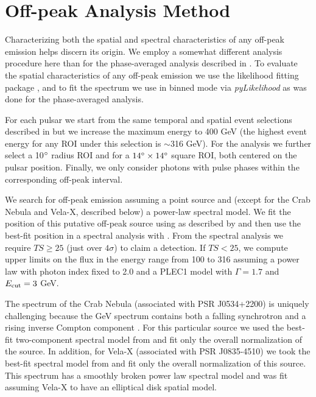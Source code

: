 \section{Off-peak Analysis Method}

Characterizing both the spatial and spectral characteristics of any
off-peak emission helps discern its origin.  We employ a somewhat
different analysis procedure here than for the phase-averaged analysis
described in \citep{abdo_2013a_second-fermi}.  To evaluate the spatial
characteristics of any off-peak emission we use the likelihood fitting
package \pointlike \citep[detailed in][]{lande_2012_search-spatially}, and
to fit the spectrum we use \gtlike in binned mode via {\it pyLikelihood}
as was done for the phase-averaged analysis.

For each pulsar we start from the same temporal and spatial event
selections described in \citep{abdo_2013a_second-fermi} but we
increase the maximum energy to 400 GeV (the highest event energy for
any ROI under this selection is $\sim$316 GeV).  For the \pointlike
analysis we further select a 10$^\circ$ radius ROI and for \gtlike
a $14^\circ\times14^\circ$ square ROI, both centered on the pulsar
position.  Finally, we only consider photons with pulse phases within
the corresponding off-peak interval.

We search for off-peak emission assuming a point source and (except for
the Crab Nebula and Vela-X, described below) a power-law spectral model.
We fit the position of this putative off-peak source using \pointlike
as described by \citet{nolan_2012_fermi-large} and then use the best-fit
position in a spectral analysis with \gtlike.  From the spectral analysis
we require $TS\geq25$ (just over $4\sigma$) to claim a detection.
If $TS<25$, we compute upper limits on the flux in the energy range
from 100 \mev to 316 \gev assuming a power law with photon index fixed
to 2.0 and a PLEC1 model with $\Gamma=1.7$ and $E_{\rm cut}=3$ GeV.

The spectrum of the Crab Nebula (associated with PSR J0534+2200)
is uniquely challenging because the GeV spectrum contains
both a falling synchrotron and a rising inverse Compton
component \citep{abdo_2010a_fermi-large}.  For this particular
source we used the best-fit two-component spectral model from
\cite{buehler_2012a_gamma-ray-activity} and fit only the overall
normalization of the source.  In addition, for Vela-X (associated
with PSR J0835-4510) we took the best-fit spectral model from
\cite{grondin_2013a_vela-x-pulsar} and fit only the overall normalization
of this source. This spectrum has a smoothly broken power law spectral
model and was fit assuming Vela-X to have an elliptical disk spatial
model.

